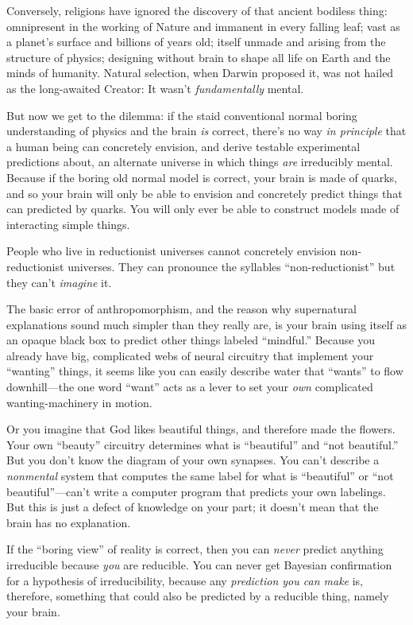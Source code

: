 {
 Conversely, religions have ignored the discovery of that ancient
bodiless thing: omnipresent in the working of Nature and immanent in
every falling leaf; vast as a planet's surface and
billions of years old; itself unmade and arising from the structure of
physics; designing without brain to shape all life on Earth and the
minds of humanity. Natural selection, when Darwin proposed it, was not
hailed as the long-awaited Creator: It wasn't
\textit{fundamentally} mental.}

{
 But now we get to the dilemma: if the staid conventional normal
boring understanding of physics and the brain \textit{is} correct,
there's no way \textit{in principle} that a human being
can concretely envision, and derive testable experimental predictions
about, an alternate universe in which things \textit{are} irreducibly
mental. Because if the boring old normal model is correct, your brain
is made of quarks, and so your brain will only be able to envision and
concretely predict things that can predicted by quarks. You will only
ever be able to construct models made of interacting simple things.}

{
 People who live in reductionist universes cannot concretely
envision non-reductionist universes. They can pronounce the syllables
``non-reductionist'' but they
can't \textit{imagine} it.}

{
 The basic error of anthropomorphism, and the reason why
supernatural explanations sound much simpler than they really are, is
your brain using itself as an opaque black box to predict other things
labeled ``mindful.'' Because you
already have big, complicated webs of neural circuitry that implement
your ``wanting'' things, it seems
like you can easily describe water that
``wants'' to flow downhill---the one
word ``want'' acts as a lever to set
your \textit{own} complicated wanting-machinery in motion.}

{
 Or you imagine that God likes beautiful things, and therefore made
the flowers. Your own ``beauty''
circuitry determines what is
``beautiful'' and
``not beautiful.'' But you
don't know the diagram of your own synapses. You
can't describe a \textit{nonmental} system that
computes the same label for what is
``beautiful'' or
``not
beautiful''---can't write a computer
program that predicts your own labelings. But this is just a defect of
knowledge on your part; it doesn't mean that the brain
has no explanation.}

{
 If the ``boring view'' of
reality is correct, then you can \textit{never} predict anything
irreducible because \textit{you} are reducible. You can never get
Bayesian confirmation for a hypothesis of irreducibility, because any
\textit{prediction you can make} is, therefore, something that could
also be predicted by a reducible thing, namely your brain.}


